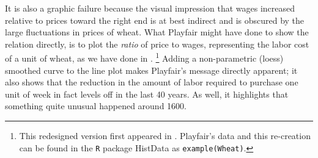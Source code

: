 It is also a graphic failure because the visual impression that wages increased relative to prices
toward the right end is at best indirect and is obscured by the large fluctuations in prices of wheat.
What Playfair might have done to show the relation directly, is to plot the \emph{ratio} of price to wages,
representing the labor cost of a unit of wheat, as we have done in .%
\footnote{ 
This redesigned version first appeared in \citet{FriendlyWainer:2004}.
Playfair's data and this re-creation can be found in the \texttt{R} package HistData \citep{HistData}
as \texttt{example(Wheat)}.
}
Adding a non-parametric (loess) smoothed curve to the line plot makes Playfair's message directly apparent;
it also shows that the reduction in the amount of labor required to purchase one unit of week in fact
levels off in the last 40 years. As well, it highlights that something quite unusual happened around 1600.
